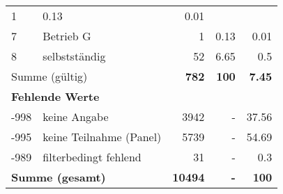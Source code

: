 \begin{longtable}{lXrrr}
       \num{1} &
       \num[round-mode=places,round-precision=2]{0,13} &
         \num[round-mode=places,round-precision=2]{0,01} \\

     7 &
     \multicolumn{1}{X}{ Betrieb G   } &


       \num{1} &
       \num[round-mode=places,round-precision=2]{0,13} &
         \num[round-mode=places,round-precision=2]{0,01} \\

     8 &
     \multicolumn{1}{X}{ selbstständig   } &


       \num{52} &
       \num[round-mode=places,round-precision=2]{6,65} &
         \num[round-mode=places,round-precision=2]{0,5} \\
     \midrule
     \multicolumn{2}{l}{Summe (gültig)} &
       \textbf{\num{782}} &
     \textbf{100} &
       \textbf{\num[round-mode=places,round-precision=2]{7,45}} \\
     \multicolumn{5}{l}{\textbf{Fehlende Werte}}\\
       -998 &
       keine Angabe &
         \num{3942} &
        - &
         \num[round-mode=places,round-precision=2]{37,56} \\
       -995 &
       keine Teilnahme (Panel) &
         \num{5739} &
        - &
         \num[round-mode=places,round-precision=2]{54,69} \\
       -989 &
       filterbedingt fehlend &
         \num{31} &
        - &
         \num[round-mode=places,round-precision=2]{0,3} \\
     \midrule
     \multicolumn{2}{l}{\textbf{Summe (gesamt)}} &
          \textbf{\num{10494}} &
        \textbf{-} &
        \textbf{100} \\
     \bottomrule
     \end{longtable}
     
